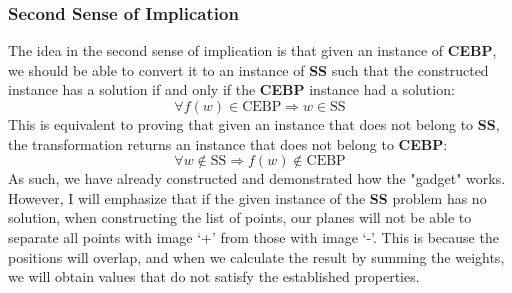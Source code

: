 \documentclass[../main]{subfiles}
\begin{document}
\subsubsection{Second Sense of Implication}
The idea in the second sense of implication is that given an instance of \textbf{CEBP}, we should be able to convert it to an instance of \textbf{SS} such that the constructed instance has a solution if and only if the \textbf{CEBP} instance had a solution:
\begin{equation*}
\forall f(w) \in \text{CEBP} \Longrightarrow w \in \text{SS}
\end{equation*}
This is equivalent to proving that given an instance that does not belong to \textbf{SS}, the transformation returns an instance that does not belong to \textbf{CEBP}:
\begin{equation*}
\forall w \notin \text{SS} \Longrightarrow f(w) \notin \text{CEBP}
\end{equation*}
As such, we have already constructed and demonstrated how the "gadget" works. However, I will emphasize that if the given instance of the \textbf{SS} problem has no solution, when constructing the list of points, our planes will not be able to separate all points with image `+' from those with image `-'. This is because the positions will overlap, and when we calculate the result by summing the weights, we will obtain values that do not satisfy the established properties.
\end{document}
